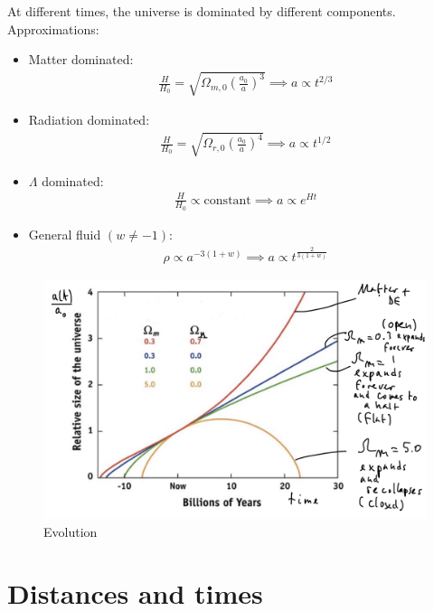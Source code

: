 At different times, the universe is dominated by different components. Approximations:
\begin{itemize}
	\item Matter dominated:
	\begin{align*}
		\frac{H}{H_0} = \sqrt{\Omega_{m,0} \left( \frac{a_0}{a}\right)^3}
		\implies a \propto t^{2/3}
	\end{align*}
	\item Radiation dominated:
	\begin{align*}
		\frac{H}{H_0} = \sqrt{\Omega_{r,0} \left( \frac{a_0}{a} \right)^4}
		\implies a \propto t^{1/2}
	\end{align*}
	\item $\Lambda$ dominated:
	\begin{align*}
		\frac{H}{H_0} \propto \text{constant}
		\implies a \propto e^{H t}
	\end{align*}
	\item General fluid $(w \neq -1)$:
	\begin{align*}
		\rho \propto a^{-3(1+w)} \implies a \propto t^{\frac{2}{3(1+w)}}
	\end{align*}
\end{itemize}

\begin{figure}
	\centering
	\includegraphics[width=\textwidth]{img/ch-02/evolution.png}
	\caption{Evolution}
	\label{fig:evolution}
\end{figure}




\section{Distances and times}



